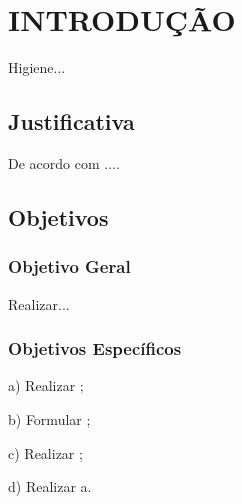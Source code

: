 
\chapter{INTRODUÇÃO}

Higiene...

\section{Justificativa}
\label{justificativa}

De acordo com ....


\section{Objetivos}

\subsection{ Objetivo Geral}

Realizar...

\subsection{Objetivos Específicos}

a) Realizar ;

b) Formular ;

c) Realizar ;

d) Realizar a.












